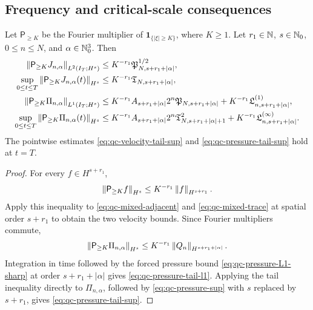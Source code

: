 \subsection{Frequency and critical-scale consequences}

\begin{proposition}
\label{prop:qc-frequency-tails}
Let \(\mathsf P_{\ge K}\) be the Fourier multiplier of
\(\mathbf 1_{\{|\xi|\ge K\}}\), where \(K\ge1\).  Let
\(r_1\in\mathbb N\), \(s\in\mathbb N_0\), \(0\le n\le N\), and
\(\alpha\in\mathbb N_0^3\).  Then
\begin{align}
 \left\lVert \mathsf P_{\ge K}J_{n,\alpha}\right\rVert_{L^2(I_T;H^s)}
 &\le K^{-r_1}\mathfrak P_{N,s+r_1+|\alpha|}^{1/2},
 \label{eq:qc-velocity-tail-l2}\\
 \sup_{0\le t\le T}
 \left\lVert \mathsf P_{\ge K}J_{n,\alpha}(t)\right\rVert_{H^s}
 &\le K^{-r_1}\mathfrak T_{N,s+r_1+|\alpha|},
 \label{eq:qc-velocity-tail-sup}\\
 \left\lVert \mathsf P_{\ge K}\Pi_{n,\alpha}\right\rVert_{L^1(I_T;H^s)}
 &\le K^{-r_1}A_{s+r_1+|\alpha|}2^n
 \mathfrak P_{N,s+r_1+|\alpha|}
 +K^{-r_1}\mathfrak L^{(1)}_{n,s+r_1+|\alpha|},
 \label{eq:qc-pressure-tail-l1}\\
 \sup_{0\le t\le T}
 \left\lVert \mathsf P_{\ge K}\Pi_{n,\alpha}(t)\right\rVert_{H^s}
 &\le K^{-r_1}A_{s+r_1+|\alpha|}2^n
 \mathfrak T_{N,s+r_1+|\alpha|+1}^2
 +K^{-r_1}\mathfrak L^{(\infty)}_{n,s+r_1+|\alpha|}.
 \label{eq:qc-pressure-tail-sup}
\end{align}
The pointwise estimates \eqref{eq:qc-velocity-tail-sup} and
\eqref{eq:qc-pressure-tail-sup} hold at \(t=T\).
\end{proposition}

\begin{proof}
For every \(f\in H^{s+r_1}\),
\[
 \left\lVert \mathsf P_{\ge K}f\right\rVert_{H^s}
 \le K^{-r_1}\left\lVert f\right\rVert_{H^{s+r_1}}.
\]
Apply this inequality to
\eqref{eq:qc-mixed-adjacent} and \eqref{eq:qc-mixed-trace} at spatial order
\(s+r_1\) to obtain the two velocity bounds.  Since Fourier multipliers
commute,
\[
 \left\lVert \mathsf P_{\ge K}\Pi_{n,\alpha}\right\rVert_{H^s}
 \le K^{-r_1}\left\lVert Q_n\right\rVert_{H^{s+r_1+|\alpha|}}.
\]
Integration in time followed by
the forced pressure bound \eqref{eq:qc-pressure-L1-sharp} at order
\(s+r_1+|\alpha|\) gives
\eqref{eq:qc-pressure-tail-l1}.  Applying the tail inequality directly to
\(\Pi_{n,\alpha}\), followed by \eqref{eq:qc-pressure-sup} with \(s\) replaced
by \(s+r_1\), gives \eqref{eq:qc-pressure-tail-sup}.
\end{proof}

